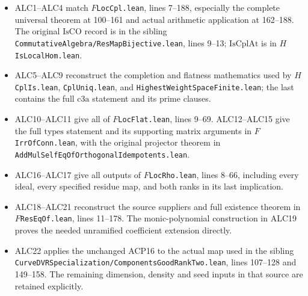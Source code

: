 \begin{itemize}
\item ALC1--ALC4 match \(F\)\texttt{LocCpl.lean},
lines 7--188, especially the complete universal theorem at
100--161 and actual arithmetic application at 162--188.
The original \(\mathrm{IsCO}\) record is in the sibling
\texttt{CommutativeAlgebra/ResMapBijective.lean}, lines 9--13;
\(\mathrm{IsCplAt}\) is in \(H\)\texttt{IsLocalHom.lean}.
\item ALC5--ALC9 reconstruct the completion and flatness
mathematics used by \(H\)\texttt{CplIs.lean},
\texttt{CplUniq.lean}, and
\texttt{HighestWeightSpaceFinite.lean}; the last contains
the full \(\mathrm{c3a}\) statement and its prime clauses.
\item ALC10--ALC11 give all of \(F\)\texttt{LocFlat.lean},
lines 9--69.  ALC12--ALC15 give the full \(\mathrm{types}\)
statement and its supporting matrix arguments in
\(F\)\texttt{IrrOfConn.lean}, with the original projector
theorem in \texttt{AddMulSelfEqOfOrthogonalIdempotents.lean}.
\item ALC16--ALC17 give all outputs of
\(F\)\texttt{LocRho.lean}, lines 8--66, including every
ideal, every specified residue map, and both ranks in its
last implication.
\item ALC18--ALC21 reconstruct the source suppliers and
full existence theorem in \(F\)\texttt{ResEqOf.lean},
lines 11--178.  The monic-polynomial construction in ALC19
proves the needed unramified coefficient extension directly.
\item ALC22 applies the unchanged ACP16 to the actual map
used in the sibling
\texttt{CurveDVRSpecialization/\allowbreak{}ComponentsGoodRankTwo.lean},
lines 107--128 and 149--158.  The remaining dimension,
density and seed inputs in that source are retained explicitly.
\end{itemize}
